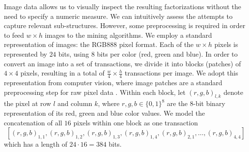 Image data allows us to visually inspect the resulting factorizations without the need to specify a numeric measure. We can intuitively assess the attempts to capture relevant sub-structures. 
However, some preprocessing is required in order to feed $w \times h$ images to the mining algorithms. 
We employ a standard representation of images: the RGB888 pixel format. Each of the $w \times h$ pixels is represented by $24$ bits, using $8$ bits per color (red, green and blue). 
In order to convert an image into a set of transactions, we divide it into blocks (patches) of $4 \times 4$ pixels, resulting in a total of $\frac{w}{4} \times \frac{h}{4}$ transactions per image. We adopt this representation from computer vision, where image patches are a standard preprocessing step for raw pixel data \citep{jarrett2009what}.
Within each block, let $(r,g,b)_{l,k}$ denote the pixel at row $l$ and column $k$, where $r,g,b\in\{0,1\}^8$ are the $8$-bit binary representation of its red, green and blue color values.
We model the concatenation of all $16$ pixels within one block as one transaction
\begin{equation*}
\left[(r,g,b)_{1,1},(r,g,b)_{1,2},(r,g,b)_{1,3},(r,g,b)_{1,4},(r,g,b)_{2,1},\dots,(r,g,b)_{4,4}\right]
\end{equation*}
which has a length of $24\cdot 16=384$ bits. 

